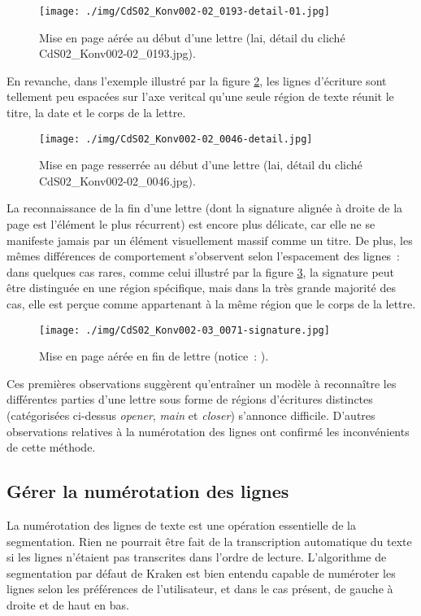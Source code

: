 \documentclass[a4paper,12pt,twoside]{book}
\begin{document}
				\begin{figure}[!h]
					\centering
					\texttt{[image: ./img/CdS02\_Konv002-02\_0193-detail-01.jpg]}%
					\caption{Mise en page aérée au début d'une lettre (\gls{lai}, détail du cliché CdS02\_Konv002-02\_0193.jpg).}%
					\label{seg-opener-193}
				\end{figure}
			
				En revanche, dans l'exemple illustré par la figure \ref{seg-glob-46}, les lignes d'écriture sont tellement peu espacées sur l'axe veritcal qu'une seule région de texte réunit le titre, la date et le corps de la lettre.
			
				\begin{figure}[!h]
					\centering
					\texttt{[image: ./img/CdS02\_Konv002-02\_0046-detail.jpg]}%
					\caption{Mise en page resserrée au début d'une lettre (\gls{lai}, détail du cliché CdS02\_Konv002-02\_0046.jpg).}%
					\label{seg-glob-46}%
				\end{figure}
				
				La reconnaissance de la fin d'une lettre (dont la signature alignée à droite de la page est l'élément le plus récurrent) est encore plus délicate, car elle ne se manifeste jamais par un élément visuellement massif comme un titre. De plus, les mêmes différences de comportement s'observent selon l'espacement des lignes~: dans quelques cas rares, comme celui illustré par la figure \ref{seg-signaure-71}, la signature peut être distinguée en une région spécifique, mais dans la très grande majorité des cas, elle est perçue comme appartenant à la même région que le corps de la lettre.
				
				\begin{figure}[!h]
					\centering
					\texttt{[image: ./img/CdS02\_Konv002-03\_0071-signature.jpg]}%
					\caption{Mise en page aérée en fin de lettre (notice~: \cite{CdS02070071}).}%
					\label{seg-signaure-71}%
				\end{figure}
				
				Ces premières observations suggèrent qu'entraîner un modèle à reconnaître les différentes parties d'une lettre sous forme de régions d'écritures distinctes (catégorisées ci-dessus \textit{opener}, \textit{main} et \textit{closer}) s'annonce difficile. D'autres observations relatives à la numérotation des lignes ont confirmé les inconvénients de cette méthode.
				
			\subsection{Gérer la numérotation des lignes}
				La numérotation des lignes de texte est une opération essentielle de la segmentation. Rien ne pourrait être fait de la transcription automatique du texte si les lignes n'étaient pas transcrites dans l'ordre de lecture. L'algorithme de segmentation par défaut de Kraken est bien entendu capable de numéroter les lignes selon les préférences de l'utilisateur, et dans le cas présent, de gauche à droite et de haut en bas.
				
\end{document}
